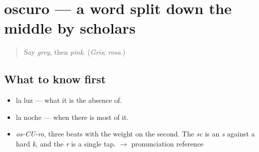 \section[oscuro]{oscuro — a word split down the middle by scholars}

\label{lesson:ES-C372-oscuro}



\begin{quote}
Say \emph{grey}, then \emph{pink}. (\emph{Gris}; \emph{rosa}.)
\end{quote}

\subsection*{What to know first}
\begin{itemize}
\raggedright
  \item la luz — what it is the absence of.
  \item la noche — when there is most of it.
\end{itemize}

\begin{sounds}
\begin{itemize}
\raggedright
  \item \emph{os-CU-ro}, three beats with the weight on the second. The \emph{sc} is an \emph{s} against a hard \emph{k}, and the \emph{r} is a single tap. $\to$ pronunciation reference
\end{itemize}
\end{sounds}


